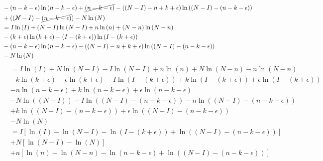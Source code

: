 \begin{answer}
\begin{align*}
            &- (n - k-\epsilon) \ln \left(n - k-\epsilon\right) + \cancel{(n - k-\epsilon)} - ((N-I) - n + k+\epsilon) \ln \left((N-I) - (n - k-\epsilon)\right) \\
            &+ ((\cancel N-I) -\cancel{(n - k-\epsilon)}) - N \ln \left(N\right)  \\
            &= I \ln \left(I\right)  + ( N-I) \ln \left(N-I\right) + n \ln \left(n\right)  + (N-n) \ln \left(N-n\right)\\
            &- (k + \epsilon) \ln \left(k + \epsilon\right)  - (I - (k+\epsilon)) \ln \left(I - (k+\epsilon)\right)  \\
            &- (n - k-\epsilon) \ln \left(n - k-\epsilon\right) - ((N-I) - n + k+\epsilon) \ln \left((N-I) - (n - k-\epsilon)\right) \\
            & - N \ln \left(N\right) \\
        \end{align*}
        \begin{align*}
            &= I \ln \left(I\right)  + N\ln \left(N-I\right)-I\ln \left(N-I\right) + n \ln \left(n\right)  + N\ln \left(N-n\right)-n\ln \left(N-n\right)\\
            &- k \ln \left(k + \epsilon\right) - \epsilon \ln \left(k + \epsilon\right)  - I \ln \left(I - (k+\epsilon)\right) + k\ln \left(I - (k+\epsilon)\right)  + \epsilon \ln \left(I - (k+\epsilon)\right)  \\
            &- n \ln \left(n - k-\epsilon\right) + k \ln \left(n - k-\epsilon\right) + \epsilon \ln \left(n - k-\epsilon\right) \\
            &- N \ln \left((N-I)\right) -I \ln \left((N-I) - (n - k-\epsilon)\right) - n \ln \left((N-I) - (n - k-\epsilon)\right) \\
            &+ k \ln \left((N-I) - (n - k-\epsilon)\right) + \epsilon \ln \left((N-I) - (n - k-\epsilon)\right) \\
            & - N \ln \left(N\right) \\
            &= I\left[
                \ln \left(I\right)  - \ln \left(N-I\right) - \ln \left(I - (k+\epsilon)\right) + \ln \left((N-I) - (n - k-\epsilon)\right)
            \right]\\
            &+ N\left[
                \ln \left(N-I\right) - \ln \left(N\right)
            \right]\\
            &+ n\left[
                \ln \left(n\right)  - \ln \left(N-n\right) - \ln \left(n - k-\epsilon\right) + \ln \left((N-I) - (n - k-\epsilon)\right)
            \right]\\
        \end{align*}
\end{answer}